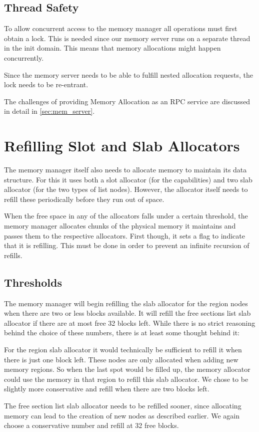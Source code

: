 \subsection{Thread Safety}

To allow concurrent access to the memory manager all operations must first obtain a lock.
This is needed since our memory server runs on a separate thread in the init domain. This means that memory allocations might happen concurrently. 


Since the memory server needs to be able to fulfill nested allocation requests, the lock needs to be re-entrant.

The challenges of providing Memory Allocation as an RPC service are discussed in detail in \autoref{sec:mem_server}.

\section{Refilling Slot and Slab Allocators}
The memory manager itself also needs to allocate memory to maintain its data structure.
For this it uses both a slot allocator (for the capabilities) and two slab allocator (for the two types of list nodes).
However, the allocator itself needs to refill these periodically before they run out of space.

When the free space in any of the allocators falls under a certain threshold, 
the memory manager allocates chunks of the physical memory it maintains and passes them to the respective allocators.
First though, it sets a flag to indicate that it is refilling. 
This must be done in order to prevent an infinite recursion of refills.

\subsection{Thresholds}
The memory manager will begin refilling the slab allocator for the region nodes when there are two or less blocks available.
It will refill the free sections list slab allocator if there are at most free 32 blocks left.
While there is no strict reasoning behind the choice of these numbers, there is at least some thought behind it:

For the region slab allocator it would technically be sufficient to refill it when there is just one block left. 
These nodes are only allocated when adding new memory regions. 
So when the last spot would be filled up, the memory allocator could use the memory in that region to refill this slab allocator.
We chose to be slightly more conservative and refill when there are two blocks left.

The free section list slab allocator needs to be refilled sooner, since allocating memory can lead to the creation of new nodes as described earlier.
We again choose a conservative number and refill at 32 free blocks.
